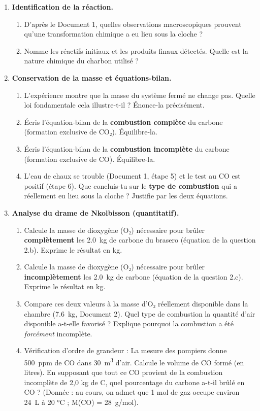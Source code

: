 \documentclass[11pt]{article}
\begin{document}
\begin{enumerate}
    \item \textbf{Identification de la réaction.}
    \begin{enumerate}
        \item D'après le Document 1, quelles observations macroscopiques prouvent qu'une transformation chimique a eu lieu sous la cloche ?
        \item Nomme les réactifs initiaux et les produits finaux détectés. Quelle est la nature chimique du charbon utilisé ?
    \end{enumerate}
    
    \item \textbf{Conservation de la masse et équations-bilan.}
    \begin{enumerate}
        \item L'expérience montre que la masse du système fermé ne change pas. Quelle loi fondamentale cela illustre-t-il ? Énonce-la précisément.
        \item Écris l'équation-bilan de la \textbf{combustion complète} du carbone (formation exclusive de CO₂). Équilibre-la.
        \item Écris l'équation-bilan de la \textbf{combustion incomplète} du carbone (formation exclusive de CO). Équilibre-la.
        \item L'eau de chaux se trouble (Document 1, étape 5) et le test au CO est positif (étape 6). Que concluis-tu sur le \textbf{type de combustion} qui a réellement eu lieu sous la cloche ? Justifie par les deux équations.
    \end{enumerate}
    
    \item \textbf{Analyse du drame de Nkolbisson (quantitatif).}
    \begin{enumerate}
        \item Calcule la masse de dioxygène (O₂) nécessaire pour brûler \textbf{complètement} les \SI{2,0}{kg} de carbone du brasero (équation de la question 2.b). Exprime le résultat en kg.
        \item Calcule la masse de dioxygène (O₂) nécessaire pour brûler \textbf{incomplètement} les \SI{2,0}{kg} de carbone (équation de la question 2.c). Exprime le résultat en kg.
        \item Compare ces deux valeurs à la masse d'O₂ réellement disponible dans la chambre (\SI{7,6}{kg}, Document 2). Quel type de combustion la quantité d'air disponible a-t-elle favorisé ? Explique pourquoi la combustion a été \emph{forcément} incomplète.
        \item Vérification d'ordre de grandeur : La mesure des pompiers donne \num{500}~ppm de CO dans \SI{30}{\cubic\meter} d'air. Calcule le volume de CO formé (en litres). En supposant que tout ce CO provient de la combustion incomplète de 2,0 kg de C, quel pourcentage du carbone a-t-il brûlé en CO ? (Donnée : au cours, on admet que 1 mol de gaz occupe environ \SI{24}{L} à 20 °C ; M(CO) = \SI{28}{g/mol}).
    \end{enumerate}
    

\end{enumerate}
\end{document}
